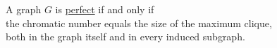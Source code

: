 \documentclass[preview]{standalone}
\begin{document}
\begin{center}
A graph $G$ is \underline{perfect} if and only if\\the chromatic number equals the size of the maximum clique,\\both in the graph itself and in every induced subgraph.
\end{center}
\end{document}
